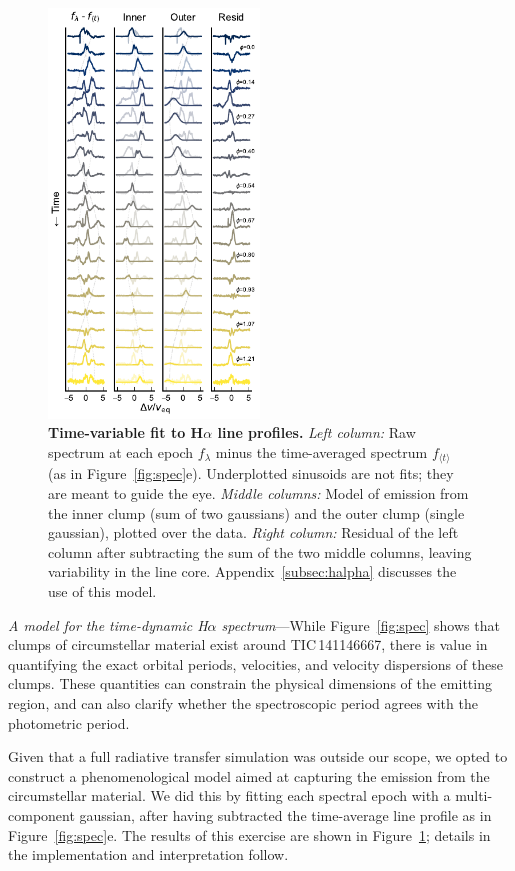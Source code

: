 \documentclass[11pt,twocolumn,tighten,linenumbers]{aastex7}
\begin{document}
\begin{figure}[!tp]
  \centering
  \includegraphics[width=0.5\textwidth]{f6.pdf}
  \caption{{\bf Time-variable fit to H$\alpha$ line profiles.}  {\it Left
  column:} Raw spectrum at each epoch $f_{\lambda}$ minus the
  time-averaged spectrum $f_{\langle t \rangle}$ (as in
  Figure~\ref{fig:spec}e).  Underplotted sinusoids are not fits; they
  are meant to guide the eye.  {\it Middle columns:} Model of emission
  from the inner clump (sum of two gaussians) and the outer clump
  (single gaussian), plotted over the data.  {\it Right column:}
  Residual of the left column after subtracting the sum of the two
  middle columns, leaving variability in the line core.
  Appendix~\ref{subsec:halpha} discusses the use of this model.  }
  \label{fig:halphamodel}
\end{figure}

{\it A model for the time-dynamic H$\alpha$ spectrum}---While
Figure~\ref{fig:spec} shows that clumps of circumstellar material
exist around TIC\,141146667, there is value in quantifying the exact
orbital periods, velocities, and velocity dispersions of these clumps.
These quantities can constrain the physical dimensions of the emitting
region, and can also clarify whether the spectroscopic period agrees
with the photometric period.

Given that a full radiative transfer simulation was outside our scope,
we opted to construct a phenomenological model aimed at capturing the
emission from the circumstellar material.  We did this by fitting each
spectral epoch with a multi-component gaussian, after having
subtracted the time-average line profile as in Figure~\ref{fig:spec}e.
The results of this exercise are shown in
Figure~\ref{fig:halphamodel}; details in the implementation and
interpretation follow.
\end{document}
